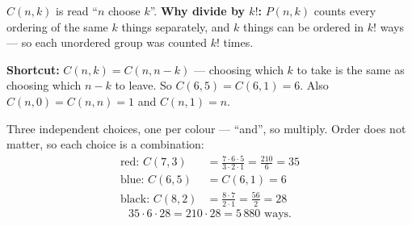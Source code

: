 \documentclass{fkt-notes}
\theoremstyle{definition}
\begin{document}
\noindent $C(n, k)$ is read ``$n$ choose $k$''. \textbf{Why divide by
  $k!$:} $P(n, k)$ counts every ordering of the same $k$ things
separately, and $k$ things can be ordered in $k!$ ways --- so each
unordered group was counted $k!$ times.

\begin{rulepar}
  \noindent \textbf{Shortcut:} $C(n, k) = C(n, n-k)$ --- choosing which
  $k$ to take is the same as choosing which $n - k$ to leave. So
  $C(6, 5) = C(6, 1) = 6$. Also $C(n, 0) = C(n, n) = 1$ and
  $C(n, 1) = n$.
\end{rulepar}

\begin{example}
  Three independent choices, one per colour --- ``and'', so
  multiply. Order does not matter, so each choice is a combination:
  \begin{align*}
    \text{red: } C(7, 3)   & = \frac{7 \cdot 6 \cdot 5}{3 \cdot 2 \cdot 1}
    = \frac{210}{6} = 35                                                       \\
    \text{blue: } C(6, 5)  & = C(6, 1) = 6                                     \\
    \text{black: } C(8, 2) & = \frac{8 \cdot 7}{2 \cdot 1} = \frac{56}{2} = 28
  \end{align*}
  \[
    35 \cdot 6 \cdot 28 = 210 \cdot 28 = 5\,880 \text{ ways.}
  \]
\end{example}
\end{document}
